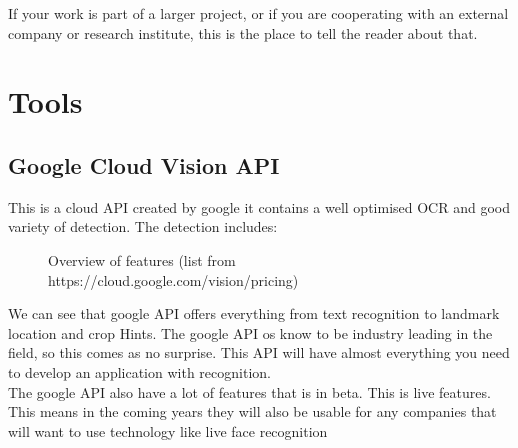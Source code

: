 If your work is part of a larger project, or if you are cooperating with an external company or research institute, this is the place to tell the reader about that.













\section{Tools}\label{sec:tools}
\subsection{Google Cloud Vision API}\label{subsec:API_Google}


This is a cloud API created by google it contains a well optimised OCR and good variety of detection.
The detection includes:

\begin{figure}[h]
    \caption{Overview of features (list from https://cloud.google.com/vision/pricing)}
    \label{fig:Features}
\end{figure}

We can see that google API offers everything from text recognition to landmark location and crop Hints.
The google API os know to be industry leading in the field, so this comes as no surprise.
This API will have almost everything you need to develop an application with recognition.
\\
The google API also have a lot of features that is in beta.
This is live features.
This means in the coming years they will also be usable for any companies that will want to use technology like live face recognition
\clearpage


